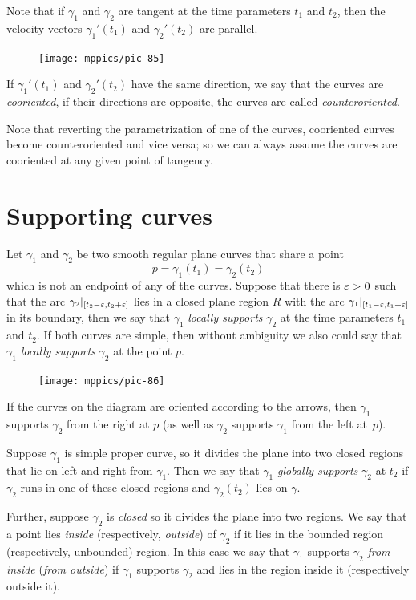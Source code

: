 Note that if $\gamma_1$ and $\gamma_2$ are tangent at the time parameters $t_1$ and $t_2$, 
then the velocity vectors $\gamma_1'(t_1)$ and $\gamma_2'(t_2)$ are parallel.
\begin{figure}[h!]
\vskip-0mm
\centering
\texttt{[image: mppics/pic-85]}
\vskip0mm
\end{figure}
If $\gamma_1'(t_1)$ and $\gamma_2'(t_2)$ have the same direction, we say that the curves are \emph{cooriented},
if their directions are opposite, the curves are called \emph{counteroriented}.


Note that reverting the parametrization of one of the curves, cooriented curves become counteroriented and vice versa; so we can always assume the curves are cooriented at any given point of tangency.

\section{Supporting curves}

Let $\gamma_1$ and $\gamma_2$ be two smooth regular plane curves that share a point \[p=\gamma_1(t_1)=\gamma_2(t_2)\] which is not an endpoint of any of the curves.
Suppose that there is $\varepsilon>0$ such that the arc $\gamma_2|_{[t_2-\varepsilon, t_2+\varepsilon]}$ lies in a closed plane region $R$ with the arc $\gamma_1|_{[t_1-\varepsilon, t_1+\varepsilon]}$ in its boundary,
then we say that $\gamma_1$ \emph{locally supports} $\gamma_2$ at the time parameters $t_1$ and $t_2$.
If both curves are simple, then  without ambiguity we also could say that $\gamma_1$ {}\emph{locally supports} $\gamma_2$ at the point $p$.

\begin{figure}
\vskip-3mm
\centering
\texttt{[image: mppics/pic-86]}
\vskip0mm
\end{figure}

If the curves on the diagram are oriented according to the arrows, then $\gamma_1$ supports $\gamma_2$ from the right at $p$ (as well as $\gamma_2$ supports $\gamma_1$ from the left at~$p$).

Suppose $\gamma_1$ is simple proper curve, so it divides the plane into two closed regions that lie on left and right from $\gamma_1$. Then we say that $\gamma_1$ \emph{globally supports} $\gamma_2$ at $t_2$ 
if $\gamma_2$ runs in one of these closed regions and 
$\gamma_2(t_2)$ lies on $\gamma$.

Further, suppose $\gamma_2$ is \emph{closed} so it divides the plane into two regions.
We say that a point lies \emph{inside} (respectively, \emph{outside}) of $\gamma_2$ if it lies in the bounded region (respectively, unbounded) region.
In this case we say that $\gamma_1$ supports $\gamma_2$ \emph{from inside} (\emph{from outside}) if $\gamma_1$ supports $\gamma_2$ and lies in the region inside it (respectively outside it). 

